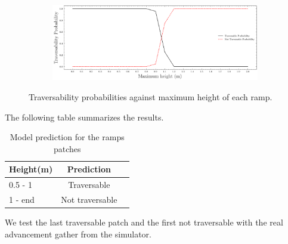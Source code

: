 \begin{figure}[H]
    \centering
\begin{subfigure}[b]{1\textwidth}
    \includegraphics[width=\linewidth]{../img/5/custom_patches/ramp/predictions.png}
    \end{subfigure}
    \caption{Traversability probabilities against maximum height of each ramp.}
\end{figure}
The following table summarizes the results.

\begin{table}[H]
    \centering
    \begin{tabular}{l|cc}
        Height(m) & Prediction \\ 
        \hline
        0.5 - 1  &  Traversable \\ 
        1 - end & Not traversable \\ 
        \hline
    \end{tabular}
    \caption{Model prediction for the ramps patches}
\end{table}
We test the last traversable patch and the first not traversable with the real advancement gather from the simulator.

